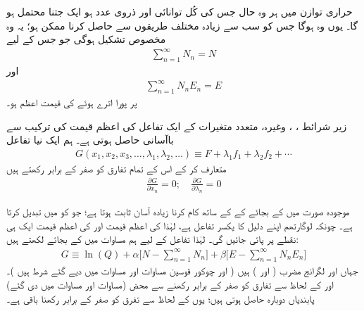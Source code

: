 حراری توازن میں ہر وہ حال جس کی کُل توانائی  اور ذروی عدد  ہو ایک جتنا محتمل ہو گا۔ یوں   وہ ہوگا جس کو سب سے زیادہ مختلف طریقوں سے حاصل کرنا ممکن ہو؛ یہ وہ مخصوص تشکیل ہوگی جو جس کے لیے 
\begin{align}\label{مساوات_متماثل_شرط_الف}
\sum_{n = 1}^{\infty} N_n = N
\end{align}
اور 
\begin{align}\label{مساوات_متماثل_شرط_ب}
\sum_{n = 1}^{\infty} N_n E_n = E
\end{align}
پر پورا اترے ہوئے  کی قیمت اعظم ہو۔

 زیر شرائط ، ، وغیرہ، متعدد متغیرات کے ایک تفاعل  کی اعظم قیمت  کی ترکیب سے باآسانی حاصل ہوتی ہے۔ ہم ایک نیا تفاعل 
\begin{align}\label{مساوات_متماثل_لگرانج_الف}
G (x_1 , x_2 , x_3 , \dotsc , \lambda_1 , \lambda_2 , \dotsc) \equiv F + \lambda_1 f_1 + \lambda_2 f_2 + \cdots
\end{align}
متعارف کر کے اس کے تمام تفارق کو صفر کے برابر رکھتے ہیں 
\begin{align}
\frac{\partial G}{\partial x_n} = 0; \quad \frac{\partial G}{\partial \lambda_n} = 0
\end{align}

موجودہ صورت میں  کے بجائے  کے  کے ساتھ کام کرنا زیادہ آسان ثابت ہوتا ہے؛ جو  کو  میں تبدیل کرتا ہے۔ چونکہ لوگارتھم اپنے دلیل کا یکسر تفاعل ہے، لہٰذا  کی اعظم قیمت اور  کی اعظم قیمت ایک ہی نقطے پر پائی جائیں گی۔ لہٰذا تفاعل  کے لیے ہم مساوات  میں  کے بجائے  لکھتے ہیں:
\begin{align}\label{مساوات_متماثل_لگرانج_ب}
G \equiv \ln(Q) + \alpha \big [ N - \sum_{n = 1}^{\infty} N_n \big ] + \beta \big [ E - \sum_{n = 1}^{\infty} N_n E_n \big ]
\end{align}
جہاں  اور  لگرانج مضرب ( اور ) ہیں ( اور چوکور قوسین مساوات  اور مساوات  میں دیے گئے شرط ہیں )۔  اور  کے لحاظ سے تفارق کو صفر کے برابر رکھنے سے محض (مساوات  اور مساوات  میں دی گئے) پابندیاں دوبارہ حاصل ہوتی ہیں؛ یوں  کے لحاظ سے تفرق کو صفر کے برابر رکھنا باقی ہے۔

